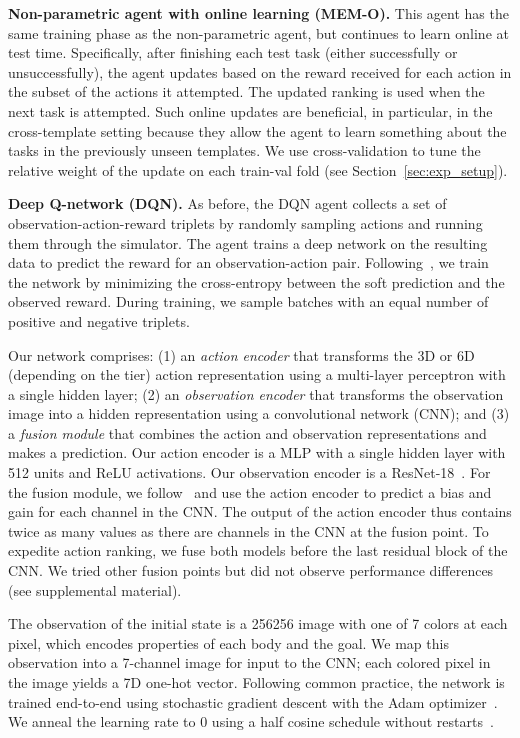 \documentclass{article}
\begin{document}
\noindent\textbf{Non-parametric agent with online learning (MEM-O).} This agent has the same training phase as the non-parametric agent, but continues to learn online at test time. Specifically, after finishing each test task (either successfully or unsuccessfully), the agent updates  based on the reward received for each action  in the subset of the actions it attempted. The updated ranking is used when the next task is attempted. Such online updates are beneficial, in particular, in the cross-template setting because they allow the agent to learn something about the tasks in the previously unseen templates. We use cross-validation to tune the relative weight of the  update on each train-val fold (see Section~\ref{sec:exp_setup}).

\noindent\textbf{Deep Q-network (DQN).} As before, the DQN agent collects a set of observation-action-reward triplets by randomly sampling actions and running them through the simulator.
The agent trains a deep network on the resulting data to predict the reward for an observation-action pair.
Following~\cite{bellemare2017distributional}, we train the network by minimizing the cross-entropy between the soft prediction and the observed reward.
During training, we sample batches with an equal number of positive and negative triplets.

Our network comprises: (1) an \emph{action encoder} that transforms the 3D or 6D (depending on the tier) action representation using a multi-layer perceptron with a single hidden layer; (2) an \emph{observation encoder} that transforms the observation image into a hidden representation using a convolutional network (CNN); and (3) a \emph{fusion module} that combines the action and observation representations and makes a prediction. Our action encoder is a MLP with a single hidden layer with 512 units and ReLU activations. Our observation encoder is a ResNet-18~\cite{he2016deep}. For the fusion module, we follow~\cite{perez2018film} and use the action encoder to predict a bias and gain for each channel in the CNN. The output of the action encoder thus contains twice as many values as there are channels in the CNN at the fusion point. To expedite action ranking, we fuse both models before the last residual block of the CNN. We tried other fusion points but did not observe performance differences (see supplemental material).

The observation of the initial state is a 256256 image with one of 7 colors at each pixel, which encodes properties of each body and the goal. We map this observation into a 7-channel image for input to the CNN; each colored pixel in the image yields a 7D one-hot vector. Following common practice, the network is trained end-to-end using stochastic gradient descent with the Adam optimizer~\cite{kingma2014adam}. We anneal the learning rate to 0 using a half cosine schedule without restarts~\cite{loshchilov2016sgdr}.
\end{document}
